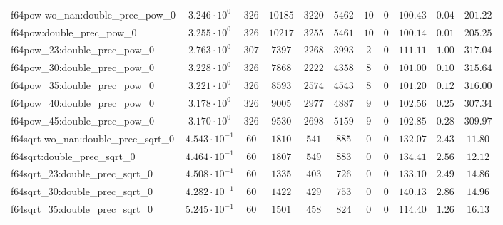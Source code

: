 \begin{tabular}{|l|c|c|c|c|c|c|c|c|c|c|}
f64pow-wo\_nan:double\_prec\_pow\_0            & $ 3.246 \cdot 10^{0}  $ & $ 326    $ & $ 10185  $ & $ 3220  $ & $ 5462  $ & $ 10  $ & $ 0 $ & $ 100.43      $ & $ 0.04    $ & $ 201.22  $ \\
f64pow:double\_prec\_pow\_0                    & $ 3.255 \cdot 10^{0}  $ & $ 326    $ & $ 10217  $ & $ 3255  $ & $ 5461  $ & $ 10  $ & $ 0 $ & $ 100.14      $ & $ 0.01    $ & $ 205.25  $ \\
f64pow\_23:double\_prec\_pow\_0                & $ 2.763 \cdot 10^{0}  $ & $ 307    $ & $ 7397   $ & $ 2268  $ & $ 3993  $ & $ 2   $ & $ 0 $ & $ 111.11      $ & $ 1.00    $ & $ 317.04  $ \\
f64pow\_30:double\_prec\_pow\_0                & $ 3.228 \cdot 10^{0}  $ & $ 326    $ & $ 7868   $ & $ 2222  $ & $ 4358  $ & $ 8   $ & $ 0 $ & $ 101.00      $ & $ 0.10    $ & $ 315.64  $ \\
f64pow\_35:double\_prec\_pow\_0                & $ 3.221 \cdot 10^{0}  $ & $ 326    $ & $ 8593   $ & $ 2574  $ & $ 4543  $ & $ 8   $ & $ 0 $ & $ 101.20      $ & $ 0.12    $ & $ 316.00  $ \\
f64pow\_40:double\_prec\_pow\_0                & $ 3.178 \cdot 10^{0}  $ & $ 326    $ & $ 9005   $ & $ 2977  $ & $ 4887  $ & $ 9   $ & $ 0 $ & $ 102.56      $ & $ 0.25    $ & $ 307.34  $ \\
f64pow\_45:double\_prec\_pow\_0                & $ 3.170 \cdot 10^{0}  $ & $ 326    $ & $ 9530   $ & $ 2698  $ & $ 5159  $ & $ 9   $ & $ 0 $ & $ 102.85      $ & $ 0.28    $ & $ 309.97  $ \\
f64sqrt-wo\_nan:double\_prec\_sqrt\_0          & $ 4.543 \cdot 10^{-1} $ & $ 60     $ & $ 1810   $ & $ 541   $ & $ 885   $ & $ 0   $ & $ 0 $ & $ 132.07      $ & $ 2.43    $ & $ 11.80   $ \\
f64sqrt:double\_prec\_sqrt\_0                  & $ 4.464 \cdot 10^{-1} $ & $ 60     $ & $ 1807   $ & $ 549   $ & $ 883   $ & $ 0   $ & $ 0 $ & $ 134.41      $ & $ 2.56    $ & $ 12.12   $ \\
f64sqrt\_23:double\_prec\_sqrt\_0              & $ 4.508 \cdot 10^{-1} $ & $ 60     $ & $ 1335   $ & $ 403   $ & $ 726   $ & $ 0   $ & $ 0 $ & $ 133.10      $ & $ 2.49    $ & $ 14.86   $ \\
f64sqrt\_30:double\_prec\_sqrt\_0              & $ 4.282 \cdot 10^{-1} $ & $ 60     $ & $ 1422   $ & $ 429   $ & $ 753   $ & $ 0   $ & $ 0 $ & $ 140.13      $ & $ 2.86    $ & $ 14.96   $ \\
f64sqrt\_35:double\_prec\_sqrt\_0              & $ 5.245 \cdot 10^{-1} $ & $ 60     $ & $ 1501   $ & $ 458   $ & $ 824   $ & $ 0   $ & $ 0 $ & $ 114.40      $ & $ 1.26    $ & $ 16.13   $ \\

\end{tabular}
